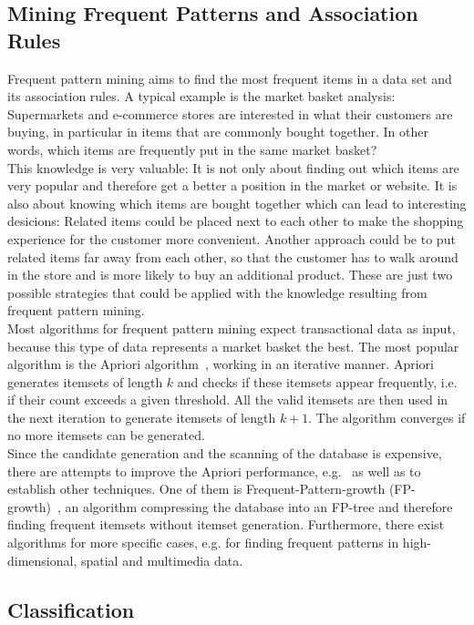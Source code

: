 \subsection{Mining Frequent Patterns and Association Rules}
Frequent pattern mining aims to find the most frequent items in a data set and its association rules. A typical example is the market basket analysis: Supermarkets and e-commerce stores are interested in what their customers are buying, in particular in items that are commonly bought together. In other words, which items are frequently put in the same market basket?
\\
This knowledge is very valuable: It is not only about finding out which items are very popular and therefore get a better a position in the market or website. It is also about knowing which items are bought together which can lead to interesting desicions: Related items could be placed next to each other to make the shopping experience for the customer more convenient. Another approach could be to put related items far away from each other, so that the customer has to walk around in the store and is more likely to buy an additional product. These are just two possible strategies that could be applied with the knowledge resulting from frequent pattern mining.
\\
Most algorithms for frequent pattern mining expect transactional data as input, because this type of data represents a market basket the best. The most popular algorithm is the Apriori algorithm~\parencite{apriori}, working in an iterative manner. Apriori generates itemsets of length $k$ and checks if these itemsets appear frequently, i.e. if their count exceeds a given threshold. All the valid itemsets are then used in the next iteration to generate itemsets of length $k+1$. The algorithm converges if no more itemsets can be generated.
\\
Since the candidate generation and the scanning of the database is expensive, there are attempts to improve the Apriori performance, e.g.~\parencite{ap1}\parencite{ap2} as well as to establish other techniques. One of them is Frequent-Pattern-growth (FP-growth)~\parencite{fpgrowth}, an algorithm compressing the database into an FP-tree and therefore finding frequent itemsets without itemset generation. Furthermore, there exist algorithms for more specific cases, e.g. for finding frequent patterns in high-dimensional, spatial and multimedia data.

\subsection{Classification}


